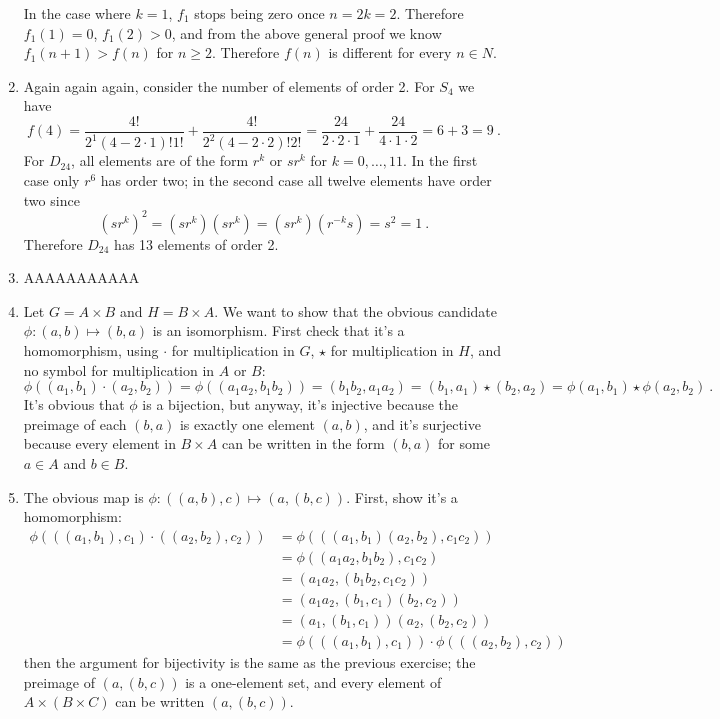 \documentclass[]{article}
\begin{document}
\begin{enumerate}
In the case where $k=1$, $f_1$ stops being zero once $n = 2k = 2$. Therefore $f_1(1) = 0$, $f_1(2) > 0$, and from the above general proof we know $f_1(n+1) > f(n)$ for $n\geq 2$. Therefore $f(n)$ is different for every $n \in N$.


\item Again again again, consider the number of elements of order 2. For $S_4$ we have
\begin{equation}
f(4) = \frac{4!}{2^1(4-2\cdot1)!1!} + \frac{4!}{2^2(4-2\cdot2)!2!} = \frac{24}{2\cdot 2\cdot 1} + \frac{24}{4\cdot 1\cdot 2} = 6 + 3 = 9\ .
\end{equation}
For $D_{24}$, all elements are of the form $r^k$ or $sr^k$ for $k = 0,\ldots,11$. In the first case only $r^6$ has order two; in the second case all twelve elements have order two since 
\begin{equation}
(sr^k)^2 = (sr^k)(sr^k) = (sr^k)(r^{-k}s) = s^2 = 1\ . 
\end{equation}
Therefore $D_{24}$ has 13 elements of order 2.


\item AAAAAAAAAAA


\item Let $G = A\times B$ and $H = B\times A$. We want to show that the obvious candidate $\phi: (a,b) \mapsto (b,a)$ is an isomorphism. First check that it's a homomorphism, using $\cdot$ for multiplication in $G$, $\star$ for multiplication in $H$, and no symbol for multiplication in $A$ or $B$:
\begin{equation}
\phi((a_1,b_1) \cdot (a_2,b_2)) = \phi((a_1a_2,b_1b_2)) = (b_1b_2,a_1a_2) = (b_1,a_1) \star (b_2,a_2) = \phi(a_1,b_1) \star \phi(a_2,b_2)\ .
\end{equation}
It's obvious that $\phi$ is a bijection, but anyway, it's injective because the preimage of each $(b,a)$ is exactly one element $(a,b)$, and it's surjective because every element in $B\times A$ can be written in the form $(b,a)$ for some $a \in A$ and $b \in B$.


\item The obvious map is $\phi: ((a,b),c) \mapsto (a,(b,c))$. First, show it's a homomorphism:
\begin{align}
\phi(((a_1,b_1),c_1) \cdot ((a_2,b_2),c_2)) &= \phi( ((a_1,b_1)(a_2,b_2),c_1c_2) ) \\
&= \phi((a_1a_2,b_1b_2),c_1c_2) \\
&= (a_1a_2,(b_1b_2,c_1c_2)) \\
&= (a_1a_2,(b_1,c_1)(b_2,c_2)) \\
&= (a_1,(b_1,c_1))(a_2,(b_2,c_2)) \\
&= \phi(((a_1,b_1),c_1)) \cdot \phi(((a_2,b_2),c_2))
\end{align}
then the argument for bijectivity is the same as the previous exercise; the preimage of $(a,(b,c))$ is a one-element set, and every element of $A \times (B \times C)$ can be written $(a,(b,c))$.



\end{enumerate}
\end{document}
